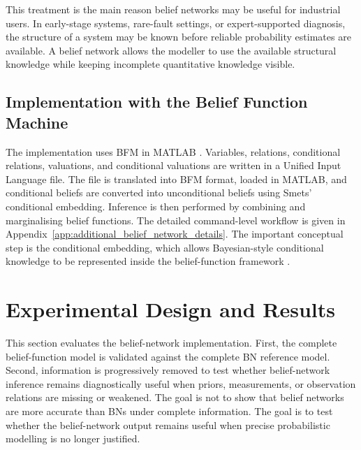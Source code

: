 \documentclass[runningheads]{llncs}
\begin{document}
This treatment is the main reason belief networks may be useful for industrial users. In early-stage systems, rare-fault settings, or expert-supported diagnosis, the structure of a system may be known before reliable probability estimates are available. A belief network allows the modeller to use the available structural knowledge while keeping incomplete quantitative knowledge visible.

\subsection{Implementation with the Belief Function Machine}
\label{sec:implementation_bfm}

The implementation uses BFM in MATLAB \cite{GiangShenoy2003BFM}. Variables, relations, conditional relations, valuations, and conditional valuations are written in a Unified Input Language file. The file is translated into BFM format, loaded in MATLAB, and conditional beliefs are converted into unconditional beliefs using Smets' conditional embedding. Inference is then performed by combining and marginalising belief functions. The detailed command-level workflow is given in Appendix~\ref{app:additional_belief_network_details}. The important conceptual step is the conditional embedding, which allows Bayesian-style conditional knowledge to be represented inside the belief-function framework \cite{JirousekKratochvilShenoy2023}.


\section{Experimental Design and Results}
\label{sec:experimental_results}

This section evaluates the belief-network implementation. First, the complete belief-function model is validated against the complete BN reference model. Second, information is progressively removed to test whether belief-network inference remains diagnostically useful when priors, measurements, or observation relations are missing or weakened. The goal is not to show that belief networks are more accurate than BNs under complete information. The goal is to test whether the belief-network output remains useful when precise probabilistic modelling is no longer justified.
\end{document}
